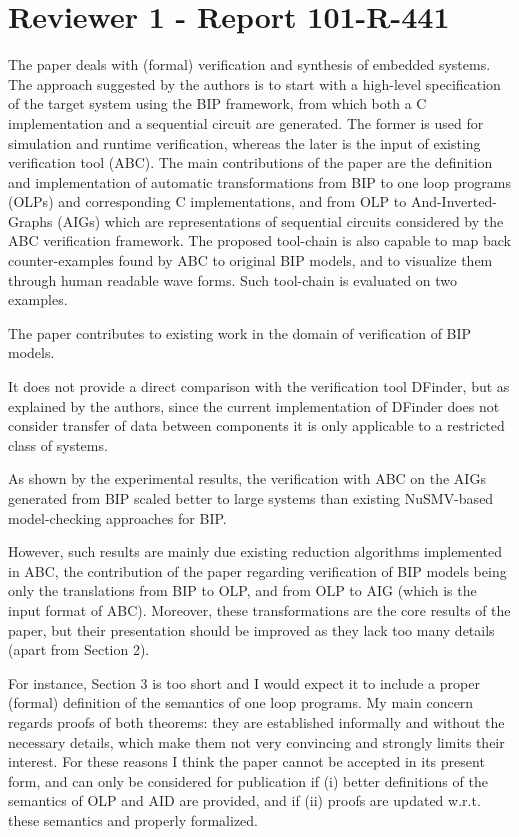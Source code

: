 \section{Reviewer 1 - Report 101-R-441}
The paper deals with (formal) verification and synthesis of embedded systems.
The approach suggested by the authors is to start with a high-level 
specification of the target system using the BIP framework, from which both a 
C implementation and a sequential circuit are generated.
The former is used for simulation and runtime verification, whereas the later 
is the input of existing verification tool (ABC).
The main contributions of the paper are the definition and implementation of 
automatic transformations from BIP to one loop programs (OLPs) and 
corresponding C implementations, and from OLP to And-Inverted-Graphs (AIGs) 
which are representations of sequential circuits considered by the ABC 
verification framework.
The proposed tool-chain is also capable to map back counter-examples found by 
ABC to original BIP models, and to visualize them through human readable wave 
forms.
Such tool-chain is evaluated on two examples.

The paper contributes to existing work in the domain of verification of BIP 
models.

It does not provide a direct comparison with the verification tool DFinder, 
but as explained by the authors, since the current implementation of DFinder 
does not consider transfer of data between components it is only applicable 
to a restricted class of systems.

\done
{}

As shown by the experimental results, the verification with ABC on the AIGs 
generated from BIP scaled better to large systems than existing NuSMV-based 
model-checking approaches for BIP.


However, such results are mainly due existing reduction algorithms 
implemented in ABC, the contribution of the paper regarding verification of 
BIP models being only the translations from BIP to OLP, and from OLP to AIG 
(which is the input format of ABC).
Moreover, these transformations are the core results of the paper, but their 
presentation should be improved as they lack too many details (apart from 
Section 2).



For instance, Section 3 is too short and I would expect it to include a 
proper (formal) definition of the semantics of one loop programs.
My main concern regards proofs of both theorems: they are established 
informally and without the necessary details, which make them not very 
convincing and strongly limits their interest.
For these reasons I think the paper cannot be accepted in its present form, 
and can only be considered for publication if (i) better definitions of the 
semantics of OLP and AID are provided, and if (ii) proofs are updated w.r.t. 
these semantics and properly formalized.

